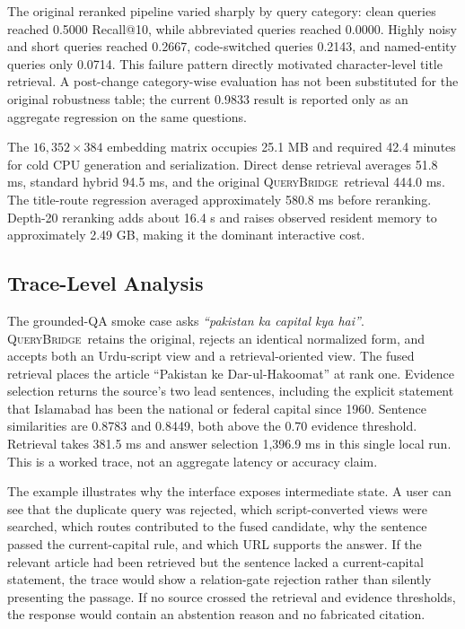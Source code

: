 \documentclass[conference]{IEEEtran}
\newcommand{\querybridge}{\textsc{QueryBridge}}
\begin{document}
The original reranked pipeline varied sharply by query category: clean queries reached 0.5000 Recall@10, while abbreviated queries reached 0.0000. Highly noisy and short queries reached 0.2667, code-switched queries 0.2143, and named-entity queries only 0.0714. This failure pattern directly motivated character-level title retrieval. A post-change category-wise evaluation has not been substituted for the original robustness table; the current 0.9833 result is reported only as an aggregate regression on the same questions.

The $16{,}352 \times 384$ embedding matrix occupies 25.1 MB and required 42.4 minutes for cold CPU generation and serialization. Direct dense retrieval averages 51.8 ms, standard hybrid 94.5 ms, and the original \querybridge\ retrieval 444.0 ms. The title-route regression averaged approximately 580.8 ms before reranking. Depth-20 reranking adds about 16.4 s and raises observed resident memory to approximately 2.49 GB, making it the dominant interactive cost.

\subsection{Trace-Level Analysis}
The grounded-QA smoke case asks \emph{``pakistan ka capital kya hai''}. \querybridge\ retains the original, rejects an identical normalized form, and accepts both an Urdu-script view and a retrieval-oriented view. The fused retrieval places the article ``Pakistan ke Dar-ul-Hakoomat'' at rank one. Evidence selection returns the source's two lead sentences, including the explicit statement that Islamabad has been the national or federal capital since 1960. Sentence similarities are 0.8783 and 0.8449, both above the 0.70 evidence threshold. Retrieval takes 381.5 ms and answer selection 1,396.9 ms in this single local run. This is a worked trace, not an aggregate latency or accuracy claim.

The example illustrates why the interface exposes intermediate state. A user can see that the duplicate query was rejected, which script-converted views were searched, which routes contributed to the fused candidate, why the sentence passed the current-capital rule, and which URL supports the answer. If the relevant article had been retrieved but the sentence lacked a current-capital statement, the trace would show a relation-gate rejection rather than silently presenting the passage. If no source crossed the retrieval and evidence thresholds, the response would contain an abstention reason and no fabricated citation.
\end{document}
